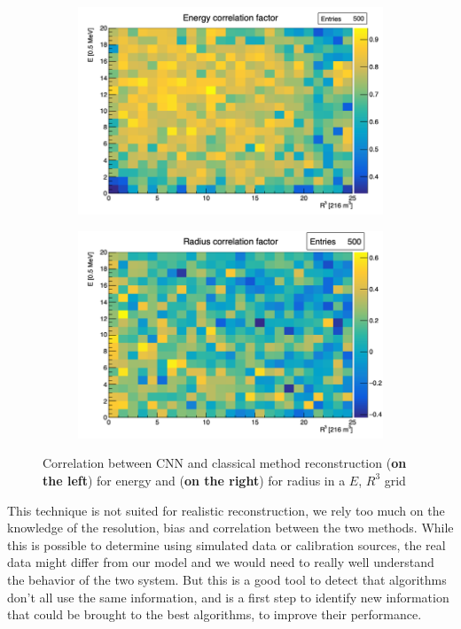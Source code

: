 \documentclass[../main.tex]{subfiles}
\begin{document}
{{\begin{figure}
  \centering
  \begin{subfigure}[t]{0.48\linewidth}
    \includegraphics[width=\linewidth]{images/jcnn/vic_cnn/vic_cnn_e_corr.png}
  \end{subfigure}
  \hfill
  \begin{subfigure}[t]{0.48\linewidth}
    \includegraphics[width=\linewidth]{images/jcnn/vic_cnn/vic_cnn_r_corr.png}
  \end{subfigure}
  \caption{Correlation between CNN and classical method reconstruction (\textbf{on the left}) for energy and (\textbf{on the right}) for radius in a $E$, $R^3$ grid}
  \label{fig:jcnn:vic_cnn:corr}
\end{figure}

This technique is not suited for realistic reconstruction, we rely too much on the knowledge of the resolution, bias and correlation between the two methods. While this is possible to determine using simulated data or calibration sources, the real data might differ from our model and we would need to really well understand the behavior of the two system. But this is a good tool to detect that algorithms don't all use the same information, and is a first step to identify new information that could be brought to the best algorithms, to improve their performance.

}}
\end{document}
